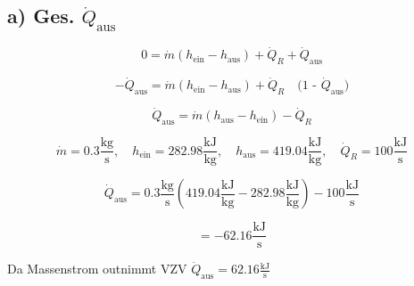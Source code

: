 \subsection*{a) Ges. $\dot{Q}_{\text{aus}}$}

\[
0 = \dot{m} (h_{\text{ein}} - h_{\text{aus}}) + \dot{Q}_R + \dot{Q}_{\text{aus}}
\]

\[
-\dot{Q}_{\text{aus}} = \dot{m} (h_{\text{ein}} - h_{\text{aus}}) + \dot{Q}_R \quad \text{(1 - $\dot{Q}_{\text{aus}}$)}
\]

\[
\dot{Q}_{\text{aus}} = \dot{m} (h_{\text{aus}} - h_{\text{ein}}) - \dot{Q}_R
\]

\[
\dot{m} = 0.3 \frac{\text{kg}}{\text{s}}, \quad h_{\text{ein}} = 282.98 \frac{\text{kJ}}{\text{kg}}, \quad h_{\text{aus}} = 419.04 \frac{\text{kJ}}{\text{kg}}, \quad \dot{Q}_R = 100 \frac{\text{kJ}}{\text{s}}
\]

\[
\dot{Q}_{\text{aus}} = 0.3 \frac{\text{kg}}{\text{s}} (419.04 \frac{\text{kJ}}{\text{kg}} - 282.98 \frac{\text{kJ}}{\text{kg}}) - 100 \frac{\text{kJ}}{\text{s}}
\]

\[
= -62.16 \frac{\text{kJ}}{\text{s}}
\]

Da Massenstrom outnimmt VZV $\dot{Q}_{\text{aus}} = 62.16 \frac{\text{kJ}}{\text{s}}$